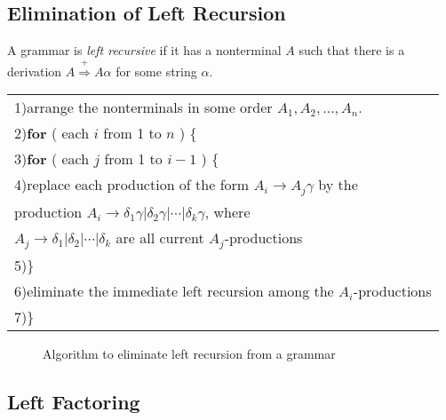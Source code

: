 \documentclass[a4paper,twoside]{book}
\begin{document}
\subsection{Elimination of Left Recursion}

A grammar is \textit{left recursive} if it has a nonterminal $A$ such that there is a derivation $A\overset{+}{\Rightarrow}A\alpha$ for some string $\alpha$.


\begin{center}
    \begin{tabular}{l}
        1)\qquad arrange the nonterminals in some order $A_1,A_2,\ldots,A_n$.\\
        2)\qquad \textbf{for} ( each $i$ from 1 to $n$ ) \{\\
        3)\qquad\qquad \textbf{for} ( each $j$ from 1 to $i-1$ ) \{\\
        4)\qquad\qquad\qquad replace each production of the form $A_i\rightarrow A_j\gamma$ by the\\
        \qquad\qquad\qquad\qquad production $A_i\rightarrow\delta_1\gamma|\delta_2\gamma|\cdots|\delta_k\gamma$, where\\
        \qquad\qquad\qquad\qquad $A_j\rightarrow\delta_1|\delta_2|\cdots|\delta_k$ are all current $A_j$-productions\\
        5)\qquad\qquad\}\\
        6)\qquad\qquad eliminate the immediate left recursion among the $A_i$-productions\\
        7)\qquad\}
    \end{tabular}
\end{center}
\begin{figure}[htbp]
    \caption{Algorithm to eliminate left recursion from a grammar}
    \label{Figure:4.11}
\end{figure}

\subsection{Left Factoring}
\end{document}
